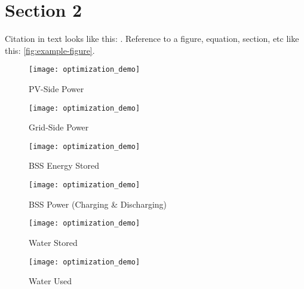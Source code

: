 \section{Section 2}
\label{sec:2}

Citation in text looks like this: \cite{Solcast}. Reference to a figure, equation, section, etc like this: \cref{fig:example-figure}.

\begin{figure}[hb]
    \centering
    \texttt{[image: optimization\_demo]}
    \caption{PV-Side Power}
    \label{fig:pv-side-power}
\end{figure}

\begin{figure}[hb]
    \centering
    \texttt{[image: optimization\_demo]}
    \caption{Grid-Side Power}
    \label{fig:grid-side-power}
\end{figure}

\begin{figure}[hb]
    \centering
    \texttt{[image: optimization\_demo]}
    \caption{BSS Energy Stored}
    \label{fig:bss-energy}
\end{figure}

\begin{figure}[hb]
    \centering
    \texttt{[image: optimization\_demo]}
    \caption{BSS Power (Charging \& Discharging)}
    \label{fig:bss-power}
\end{figure}

\begin{figure}[hb]
    \centering
    \texttt{[image: optimization\_demo]}
    \caption{Water Stored}
    \label{fig:water-level}
\end{figure}

\begin{figure}[hb]
    \centering
    \texttt{[image: optimization\_demo]}
    \caption{Water Used}
    \label{fig:water-used}
\end{figure}
